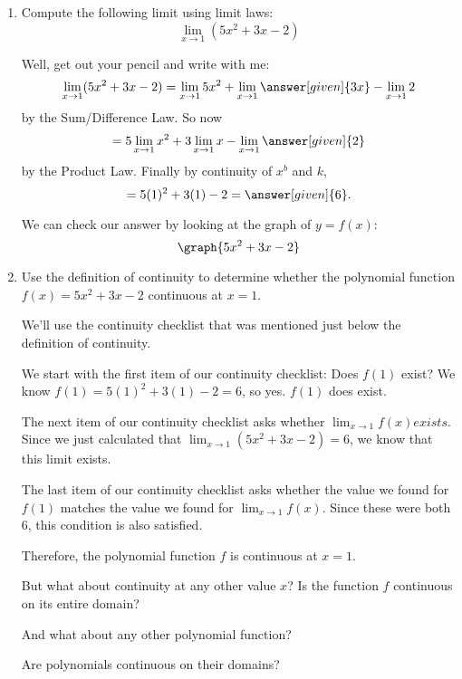 \documentclass{ximera}
\begin{document}
\begin{example}
\begin{enumerate}
\item  Compute the following limit using limit laws:
\[
  \lim_{x\to 1}(5x^2+3x-2)
\]
\begin{explanation}
  Well, get out your pencil and write with me:
  \[
  \lim_{x\to 1} (5x^2+3x-2) = \lim_{x\to 1} 5x^2 + \lim_{x\to 1} \answer[given]{3x} - \lim_{x\to 1}2
  \]
  by the Sum/Difference Law. So now
  \[
  = 5\lim_{x\to 1} x^2 + 3\lim_{x\to 1} x - \lim_{x\to 1}\answer[given]{2}
  \]
  by the Product Law. Finally by continuity of $x^b$ and $k$,
  \[
  = 5(1)^2 + 3(1) - 2 =\answer[given]{6}.
  \]
  \begin{onlineOnly}
    We can check our answer by looking at the graph of $y=f(x)$:
    \[
    \graph{5x^2+3x-2}
    \]
  \end{onlineOnly}
\end{explanation}  

\item Use the definition of continuity to determine whether the polynomial function  $f(x)=5x^2+3x-2$ continuous at $x=1$.
\begin{explanation}
We'll use the continuity checklist that was mentioned just below the definition of continuity.

We start with the first item of our continuity checklist: Does $f(1)$ exist? We know $f(1)=5(1)^2 + 3(1) - 2 = 6$, so yes. $f(1)$ does exist.

The next item of our continuity checklist asks whether $\lim_{x\to 1}f(x) exists$. 
Since we just calculated that $ \lim_{x\to 1} (5x^2+3x-2)=6$,  we know that this limit exists.

The last item of our continuity checklist asks whether the value we found for $f(1)$ matches the value we found for $\lim_{x\to 1}f(x)$. Since these were both $6$, this condition is also satisfied.

Therefore, the polynomial function $f$ is continuous at $x=1$.

But what about continuity at any other value $x$? Is the function $f$ continuous on its entire domain?

And what about any other polynomial function?

Are polynomials continuous on their domains?
\end{explanation}
\end{enumerate}
\end{example}
\end{document}
